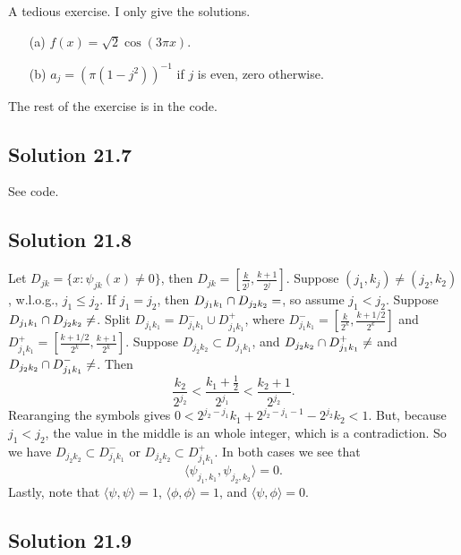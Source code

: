 A tedious exercise.
I only give the solutions.
\begin{enumerate}
    \item[(a)] $f(x) = \sqrt{2} \cos(3 \pi x)$.
    \item[(b)] $a_j = (\pi (1 - j^2))^{-1}$ if $j$ is even, zero otherwise.
\end{enumerate}
The rest of the exercise is in the code.


\subsection*{Solution 21.7}

See code.


\subsection*{Solution 21.8}

Let $D_{jk} = \{x : \psi_{jk}(x) \neq 0\}$, then $D_{jk} = \left[\frac{k}{2^j}, \frac{k + 1}{2^j}\right]$.
Suppose $(j_1, k_j) \neq (j_2, k_2)$, w.l.o.g., $j_1 \leq j_2$.
If $j_1 = j_2$, then $D_{j_1 k_1} \cap D_{j_2 k_2} = \empty$, so assume $j_1 < j_2$.
Suppose $D_{j_1 k_1} \cap D_{j_2 k_2} \neq \empty$.
Split $D_{j_1 k_1} = D_{j_1 k_1}^- \cup D_{j_1 k_1}^+$, where $D_{j_1 k_1}^- = \left[\frac{k}{2^k}, \frac{k + 1/2}{2^k}\right]$ and $D_{j_1 k_1}^+ = \left[\frac{k + 1/2}{2^k}, \frac{k + 1}{2^k}\right]$.
Suppose $D_{j_2 k_2} \subset D_{j_1 k_1}$, and $D_{j_2 k_2} \cap D_{j_1 k_1}^+ \neq \empty$ and $D_{j_2 k_2} \cap D_{j_1 k_1}^- \neq \empty$.
Then
\begin{equation*}
    \frac{k_2}{2^{j_2}} < \frac{k_1 + \frac{1}{2}}{2^{j_1}} < \frac{k_2 + 1}{2^{j_2}}.
\end{equation*}
Rearanging the symbols gives $0 < 2^{j_2 - j_1} k_1 + 2^{j_2 - j_1 - 1} - 2^{j_2}k_2 < 1$.
But, because $j_1 < j_2$, the value in the middle is an whole integer, which is a contradiction.
So we have $D_{j_2 k_2} \subset D_{j_1 k_1}^-$ or $D_{j_2 k_2} \subset D_{j_1 k_1}^+$.
In both cases we see that
\begin{equation*}
    \langle \psi_{j_1, k_1}, \psi_{j_2, k_2} \rangle = 0.
\end{equation*}
Lastly, note that $\langle \psi, \psi \rangle = 1$, $\langle \phi, \phi \rangle = 1$, and $\langle \psi, \phi \rangle = 0$.


\subsection*{Solution 21.9}

